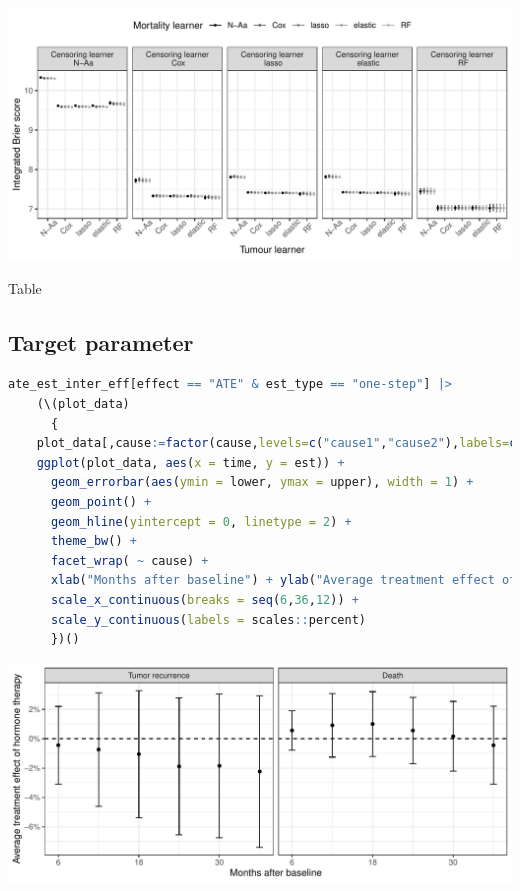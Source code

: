 \documentclass[11pt]{article}
\begin{document}
\begin{center}
\includegraphics[width=.9\linewidth]{real-data-state-learner.pdf}
\label{}
\end{center}

Table
\subsection{Target parameter}
\label{sec:orge24e597}

\begin{lstlisting}[language=r,numbers=none]
  ate_est_inter_eff[effect == "ATE" & est_type == "one-step"] |>
    (\(plot_data)
      {
	plot_data[,cause:=factor(cause,levels=c("cause1","cause2"),labels=c("Tumor recurrence","Death"))]
	ggplot(plot_data, aes(x = time, y = est)) +
	  geom_errorbar(aes(ymin = lower, ymax = upper), width = 1) + 
	  geom_point() +
	  geom_hline(yintercept = 0, linetype = 2) +
	  theme_bw() +
	  facet_wrap( ~ cause) +
	  xlab("Months after baseline") + ylab("Average treatment effect of hormone therapy") +
	  scale_x_continuous(breaks = seq(6,36,12)) +
	  scale_y_continuous(labels = scales::percent)
      })()
\end{lstlisting}

\begin{center}
\includegraphics[width=.9\linewidth]{real-data-target.pdf}
\label{}
\end{center}
\end{document}
